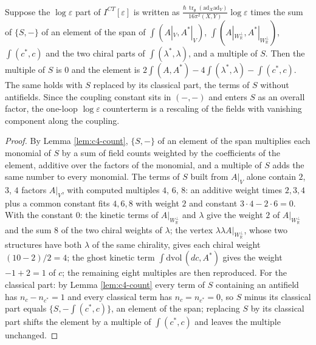 \begin{corollary}
\label{cor:c4-coupling}
Suppose the $\log\varepsilon$ part of $I^{CT}[\varepsilon]$ is written as $\frac{\hbar\,\operatorname{tr}_{\mathfrak g}(\mathrm{ad}_X\mathrm{ad}_Y)}{16\pi^2(X,Y)}\log\varepsilon$ times the sum of $\{S,-\}$ of an element of the span of $\int(A|_V,A^*|_V)$, $\int(A|_{W_{\mathbb R}^\perp},A^*|_{W_{\mathbb R}^\perp})$, $\int(c^*,c)$ and the two chiral parts of $\int(\lambda^*,\lambda)$, and a multiple of $S$. Then the multiple of $S$ is $0$ and the element is $2\int(A,A^*)-4\int(\lambda^*,\lambda)-\int(c^*,c)$. The same holds with $S$ replaced by its classical part, the terms of $S$ without antifields. Since the coupling constant sits in $(-,-)$ and enters $S$ as an overall factor, the one-loop $\log\varepsilon$ counterterm is a rescaling of the fields with vanishing component along the coupling.
\end{corollary}

\begin{proof}
By Lemma \ref{lem:c4-count}, $\{S,-\}$ of an element of the span multiplies each monomial of $S$ by a sum of field counts weighted by the coefficients of the element, additive over the factors of the monomial, and a multiple of $S$ adds the same number to every monomial. The terms of $S$ built from $A|_V$ alone contain $2$, $3$, $4$ factors $A|_V$, with computed multiples $4$, $6$, $8$: an additive weight times $2,3,4$ plus a common constant fits $4,6,8$ with weight $2$ and constant $3\cdot4-2\cdot6=0$. With the constant $0$: the kinetic terms of $A|_{W_{\mathbb R}^\perp}$ and $\lambda$ give the weight $2$ of $A|_{W_{\mathbb R}^\perp}$ and the sum $8$ of the two chiral weights of $\lambda$; the vertex $\lambda\lambda A|_{W_{\mathbb R}^\perp}$, whose two structures have both $\lambda$ of the same chirality, gives each chiral weight $(10-2)/2=4$; the ghost kinetic term $\int\mathrm{dvol}\,(dc,A^*)$ gives the weight $-1+2=1$ of $c$; the remaining eight multiples are then reproduced. For the classical part: by Lemma \ref{lem:c4-count} every term of $S$ containing an antifield has $n_c-n_{c^*}=1$ and every classical term has $n_c=n_{c^*}=0$, so $S$ minus its classical part equals $\{S,-\int(c^*,c)\}$, an element of the span; replacing $S$ by its classical part shifts the element by a multiple of $\int(c^*,c)$ and leaves the multiple unchanged.
\end{proof}

